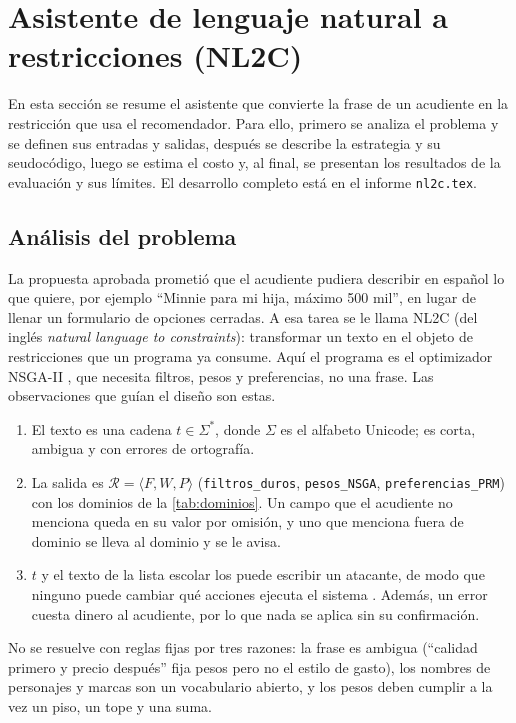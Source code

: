 \documentclass[11pt,letterpaper]{article}
\newcommand{\R}{\mathcal{R}}
\newcommand{\cod}[1]{\texttt{#1}}
\begin{document}
\section{Asistente de lenguaje natural a restricciones (NL2C)}

En esta secci\'on se resume el asistente que convierte la frase de un acudiente en la restricci\'on que usa el recomendador. Para ello,
primero se analiza el problema y se definen sus entradas y salidas, despu\'es se describe la estrategia y su seudoc\'odigo, luego se
estima el costo y, al final, se presentan los resultados de la evaluaci\'on y sus l\'imites. El desarrollo completo est\'a en el informe
\cod{nl2c.tex}.

\subsection{An\'alisis del problema}

La propuesta aprobada prometi\'o que el acudiente pudiera describir en espa\~nol lo que quiere, por ejemplo \enquote{Minnie para mi
hija, m\'aximo 500 mil}, en lugar de llenar un formulario de opciones cerradas. A esa tarea se le llama NL2C (del ingl\'es
\emph{natural language to constraints}): transformar un texto en el objeto de restricciones que un programa ya consume. Aqu\'i el
programa es el optimizador NSGA-II \citep{deb2002nsga2}, que necesita filtros, pesos y preferencias, no una frase. Las observaciones
que guían el dise\~no son estas.
\begin{enumerate}[label=\textbf{O\arabic*.},leftmargin=*]
  \item El texto es una cadena $t\in\Sigma^{*}$, donde $\Sigma$ es el alfabeto Unicode; es corta, ambigua y con errores de ortograf\'ia.
  \item La salida es $\R=\langle F,W,P\rangle$ (\cod{filtros\_duros}, \cod{pesos\_NSGA}, \cod{preferencias\_PRM}) con los dominios de
  la \cref{tab:dominios}. Un campo que el acudiente no menciona queda en su valor por omisi\'on, y uno que menciona fuera de
  dominio se lleva al dominio y se le avisa.
  \item $t$ y el texto de la lista escolar los puede escribir un atacante, de modo que ninguno puede cambiar qu\'e acciones ejecuta el sistema
  \citep{greshake2023indirect}. Adem\'as, un error cuesta dinero al acudiente, por lo que nada se aplica sin su confirmaci\'on.
\end{enumerate}
No se resuelve con reglas fijas por tres razones: la frase es ambigua (\enquote{calidad primero y precio despu\'es} fija pesos pero
no el estilo de gasto), los nombres de personajes y marcas son un vocabulario abierto, y los pesos deben cumplir a la vez un piso, un tope y
una suma.
\end{document}
